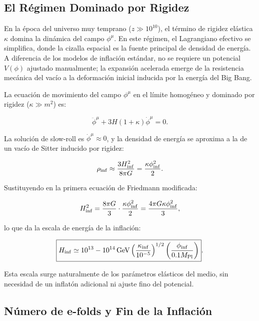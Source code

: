\documentclass[11pt,a4paper]{article}
\begin{document}
\subsection{El Régimen Dominado por Rigidez}

En la época del universo muy temprano (\( z \gg 10^{10} \)), el término de rigidez elástica \( \kappa \) domina la dinámica del campo \( \phi^\mu \). En este régimen, el Lagrangiano efectivo se simplifica, donde la cizalla espacial es la fuente principal de densidad de energía. A diferencia de los modelos de inflación estándar, no se requiere un potencial \( V(\phi) \) ajustado manualmente; la expansión acelerada emerge de la resistencia mecánica del vacío a la deformación inicial inducida por la energía del Big Bang.

La ecuación de movimiento del campo \( \phi^\mu \) en el límite homogéneo y dominado por rigidez (\( \kappa \gg m^2 \)) es:

\begin{equation}
	\ddot{\phi}^\mu + 3 H (1 + \kappa) \dot{\phi}^\mu = 0.
\end{equation}

La solución de slow-roll es \( \dot{\phi}^\mu \approx 0 \), y la densidad de energía se aproxima a la de un vacío de Sitter inducido por rigidez:

\begin{equation}
	\rho_{\rm inf} \approx \frac{3 H_{\rm inf}^2}{8\pi G} = \frac{\kappa \phi_{\rm inf}^2}{2}.
\end{equation}

Sustituyendo en la primera ecuación de Friedmann modificada:

\begin{equation}
	H_{\rm inf}^2 = \frac{8\pi G}{3} \cdot \frac{\kappa \phi_{\rm inf}^2}{2} = \frac{4\pi G \kappa \phi_{\rm inf}^2}{3},
\end{equation}

lo que da la escala de energía de la inflación:

\begin{equation}
	\boxed{H_{\rm inf} \simeq 10^{13} - 10^{14} \, \text{GeV} \left( \frac{\kappa_{\rm inf}}{10^{-5}} \right)^{1/2} \left( \frac{\phi_{\rm inf}}{0.1 M_{\rm Pl}} \right)}.
\end{equation}

Esta escala surge naturalmente de los parámetros elásticos del medio, sin necesidad de un inflatón adicional ni ajuste fino del potencial.

\subsection{Número de e-folds y Fin de la Inflación}
\end{document}
